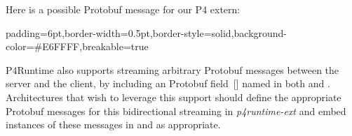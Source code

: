\documentclass[11pt]{article}
\begin{document}
{%
Here is a possible Protobuf message for our  P4 extern:%

\begin{mdbmargintb}{6pt}{6pt}%
\begin{mdblock}{padding=6pt,border-width=0.5pt,border-style=solid,background-color=\#E6FFFF,breakable=true}%
\begin{mdpre}%
\end{mdpre}%
\end{mdblock}%
\end{mdbmargintb}%

\noindent{}P4Runtime also supports streaming arbitrary Protobuf messages between the server
and the client, by including an  Protobuf field~[] named 
in both  and
. Architectures that wish to leverage this support
should define the appropriate Protobuf messages for this bidirectional streaming
in \emph{p4runtime-ext} and embed instances of these messages in
 and  as appropriate.%

}
\end{document}
